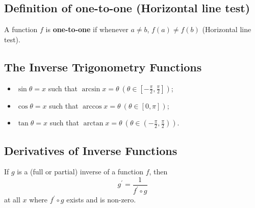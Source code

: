 \subsection{Definition of one-to-one (Horizontal line test)}
A function $f$ is \textbf{one-to-one} if whenever $a\neq b$, $f(a)\neq f(b)$ (Horizontal line test).

\subsection{The Inverse Trigonometry Functions}
\begin{itemize}
  \item$\sin\theta=x$ such that $\arcsin x=\theta\ \left(\theta\in\left[-\frac\pi 2,\frac\pi 2\right]\right)$;
  \item$\cos\theta=x$ such that $\arccos x=\theta\ \left(\theta\in\left[0,\pi\right]\right)$;
  \item$\tan\theta=x$ such that $\arctan x=\theta\ \left(\theta\in\left(-\frac\pi 2,\frac\pi 2\right)\right)$.
\end{itemize}
\subsection{Derivatives of Inverse Functions}
If $g$ is a (full or partial) inverse of a function $f$, then
\[g^\prime=\frac1{f^\prime\circ g}\]
at all $x$ where $f^\prime\circ g$ exists and is non-zero.

